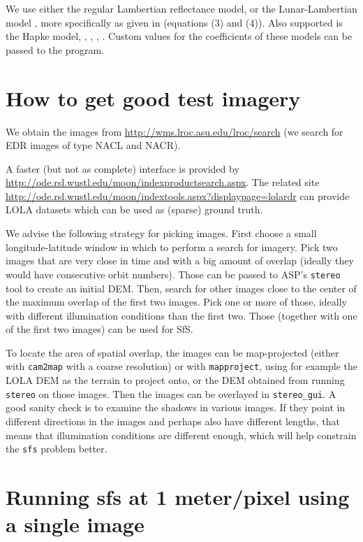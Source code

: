 We use either the regular Lambertian reflectance model,
or the Lunar-Lambertian model \cite{mcewen1991photometric}, more specifically as given in
\cite{lohse2006derivation} (equations (3) and (4)).
Also supported is the Hapke model, 
\cite{johnson2006spectrophotometric}, \cite{fernando2013surface},
\cite{hapke2008bidirectional}, \cite{hapke1993opposition}.
Custom values for the coefficients of these models can be passed to the program.

\section{How to get good test imagery}

We obtain the images from
\url{http://wms.lroc.asu.edu/lroc/search} (we search for EDR images of
type NACL and NACR). 

A faster (but not as complete) interface is provided by
\url{http://ode.rsl.wustl.edu/moon/indexproductsearch.aspx}. The related
site
\url{http://ode.rsl.wustl.edu/moon/indextools.aspx?displaypage=lolardr}
can provide LOLA datasets which can be used as (sparse) ground truth.

We advise the following strategy for picking images. First choose a small
longitude-latitude window in which to perform a search for imagery. Pick
two images that are very close in time and with a big amount of overlap
(ideally they would have consecutive orbit numbers).
Those can be passed to ASP's \texttt{stereo} tool to create an initial DEM. Then, search for 
other images close to the center of the maximum overlap of the first
two images. Pick one or more of those, ideally with different illumination
conditions than the first two. Those (together with one of the first two images) can be used for SfS.

To locate the area of spatial overlap, the images can be map-projected (either
with \texttt{cam2map} with a coarse resolution) or with
\texttt{mapproject}, using for example the LOLA DEM as the terrain to project onto, 
or the DEM obtained from running \texttt{stereo} on those images. Then the images can be overlayed
in \texttt{stereo\_gui}. A good sanity check is to examine the shadows in
various images. If they point in different directions in the images and perhaps
also have different lengths, that means that illumination conditions are
different enough, which will help constrain the \texttt{sfs} problem better.

\section{Running sfs at 1 meter/pixel using a single image}

